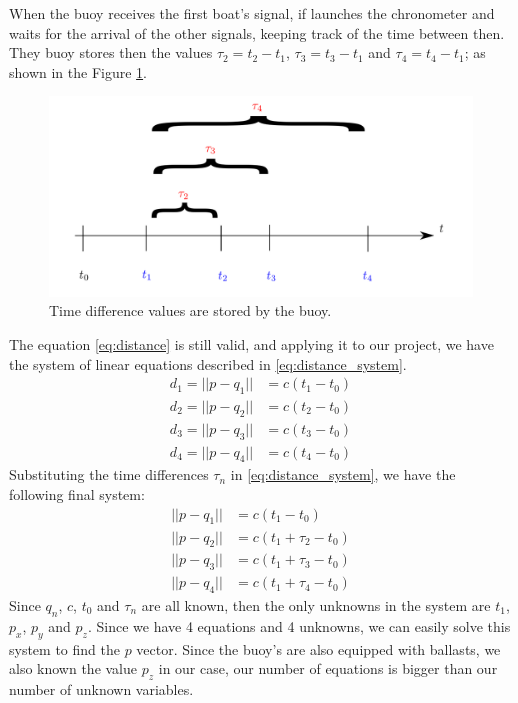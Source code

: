 \documentclass[a4paper]{report}
\begin{document}
When the buoy receives the first boat's signal, if launches the chronometer and waits for the arrival of the other signals, keeping track of the time between then.
%
They buoy stores then the values $\tau_2 = t_2 - t_1$, $\tau_3 = t_3 - t_1$ and $\tau_4 = t_4 - t_1$; as shown in the Figure \ref{fig:time_differences}.
%
\begin{figure}[H]
	\centering
	\includegraphics[width=0.7\linewidth]{image/time.png}
	\caption{Time difference values are stored by the buoy.}
	\label{fig:time_differences}
\end{figure}
%
The equation \ref{eq:distance} is still valid, and applying it to our project, we have the system of linear equations described in \ref{eq:distance_system}.
\begin{align}
d_1 = ||p - q_1|| &= c(t_1 - t_0) \nonumber \\
d_2 = ||p - q_2|| &= c(t_2 - t_0) \\
d_3 = ||p - q_3|| &= c(t_3 - t_0) \nonumber \\
d_4 = ||p - q_4|| &= c(t_4 - t_0) \nonumber 
\label{eq:distance_system}
\end{align}
%
Substituting the time differences $\tau_n$ in \ref{eq:distance_system}, we have the following final system:
\begin{align}
||p - q_1|| &= c(t_1 - t_0) \nonumber \\
||p - q_2|| &= c(t_1 + \tau_2 - t_0) \\
||p - q_3|| &= c(t_1 + \tau_3 - t_0) \nonumber \\
||p - q_4|| &= c(t_1 + \tau_4 - t_0) \nonumber 
\label{eq:distance_tdoa}
\end{align}
Since $q_n$, $c$, $t_0$ and $\tau_n$ are all known, then the only unknowns in the system are $t_1$, $p_x$, $p_y$ and $p_z$. Since we have 4 equations and 4 unknowns, we can easily solve this system to find the $p$ vector.
%
Since the buoy's are also equipped with ballasts, we also known the value $p_z$ in our case, our number of equations is bigger than our number of unknown variables.
\end{document}
